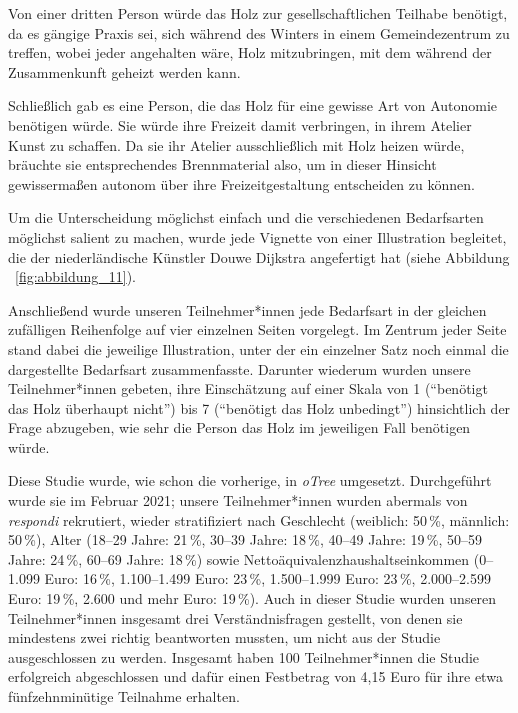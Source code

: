\documentclass[justified,nobib,nohyper,symmetric,twoside]{tufte-book}
\begin{document}
Von einer dritten Person würde das Holz zur gesellschaftlichen Teilhabe benötigt, da es gängige Praxis sei, sich während des Winters in einem Gemeindezentrum zu treffen, wobei jeder angehalten wäre, Holz mitzubringen, mit dem während der Zusammenkunft geheizt werden kann.

Schließlich gab es eine Person, die das Holz für eine gewisse Art von Autonomie benötigen würde.
Sie würde ihre Freizeit damit verbringen, in ihrem Atelier Kunst zu schaffen.
Da sie ihr Atelier ausschließlich mit Holz heizen würde, bräuchte sie entsprechendes Brennmaterial also, um in dieser Hinsicht gewissermaßen autonom über ihre Freizeitgestaltung entscheiden zu können.

Um die Unterscheidung möglichst einfach und die verschiedenen Bedarfsarten möglichst salient zu machen, wurde jede Vignette von einer Illustration begleitet, die der niederländische Künstler Douwe Dijkstra angefertigt hat (siehe Abbildung ~\ref{fig:abbildung_11}).

Anschließend wurde unseren Teilnehmer*innen jede Bedarfsart in der gleichen zufälligen Reihenfolge auf vier einzelnen Seiten vorgelegt.
Im Zentrum jeder Seite stand dabei die jeweilige Illustration, unter der ein einzelner Satz noch einmal die dargestellte Bedarfsart zusammenfasste.
Darunter wiederum wurden unsere Teilnehmer*innen gebeten, ihre Einschätzung auf einer Skala von 1 (\enquote{benötigt das Holz überhaupt nicht}) bis 7 (\enquote{benötigt das Holz unbedingt}) hinsichtlich der Frage abzugeben, wie sehr die Person das Holz im jeweiligen Fall benötigen würde.

Diese Studie wurde, wie schon die vorherige, in \textit{oTree} umgesetzt.
Durchgeführt wurde sie im Februar 2021; unsere Teilnehmer*innen wurden abermals von \textit{respondi} rekrutiert, wieder stratifiziert nach Geschlecht (weiblich: 50\,\%, männlich: 50\,\%), Alter (18--29 Jahre: 21\,\%, 30--39 Jahre: 18\,\%, 40--49 Jahre: 19\,\%, 50--59 Jahre: 24\,\%, 60--69 Jahre: 18\,\%) sowie Nettoäquivalenzhaushaltseinkommen (0--1.099 Euro: 16\,\%, 1.100--1.499 Euro: 23\,\%, 1.500--1.999 Euro: 23\,\%, 2.000--2.599 Euro: 19\,\%, 2.600 und mehr Euro: 19\,\%).
Auch in dieser Studie wurden unseren Teilnehmer*innen insgesamt drei Verständnisfragen gestellt, von denen sie mindestens zwei richtig beantworten mussten, um nicht aus der Studie ausgeschlossen zu werden.
Insgesamt haben 100 Teilnehmer*innen die Studie erfolgreich abgeschlossen und dafür einen Festbetrag von 4,15 Euro für ihre etwa fünfzehnminütige Teilnahme erhalten.
\end{document}
